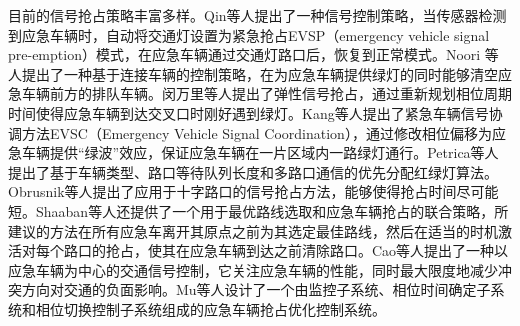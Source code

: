 
目前的信号抢占策略丰富多样。Qin等人\cite{qin_control_2012}提出了一种信号控制策略，当传感器检测到应急车辆时，自动将交通灯设置为紧急抢占EVSP（emergency vehicle signal pre-emption）模式，在应急车辆通过交通灯路口后，恢复到正常模式。Noori 等人\cite{noori2016connected}提出了一种基于连接车辆的控制策略，在为应急车辆提供绿灯的同时能够清空应急车辆前方的排队车辆。闵万里等人\cite{min}提出了弹性信号抢占，通过重新规划相位周期时间使得应急车辆到达交叉口时刚好遇到绿灯。Kang等人\cite{wenwen_kang_traffic_2014}提出了紧急车辆信号协调方法EVSC（Emergency Vehicle Signal Coordination），通过修改相位偏移为应急车辆提供“绿波”效应，保证应急车辆在一片区域内一路绿灯通行。Petrica等人提出了基于车辆类型、路口等待队列长度和多路口通信的优先分配红绿灯算法\cite{Petrica_2021}。Obrusnik等人提出了应用于十字路口的信号抢占方法，能够使得抢占时间尽可能短\cite{Obrusnik_2020}。Shaaban等人还提供了一个用于最优路线选取和应急车辆抢占的联合策略，所建议的方法在所有应急车离开其原点之前为其选定最佳路线，然后在适当的时机激活对每个路口的抢占，使其在应急车辆到达之前清除路口\cite{Shaaban_2019}。Cao等人提出了一种以应急车辆为中心的交通信号控制，它关注应急车辆的性能，同时最大限度地减少冲突方向对交通的负面影响\cite{Cao_2019}。Mu等人设计了一个由监控子系统、相位时间确定子系统和相位切换控制子系统组成的应急车辆抢占优化控制系统\cite{Mu_2018}。







